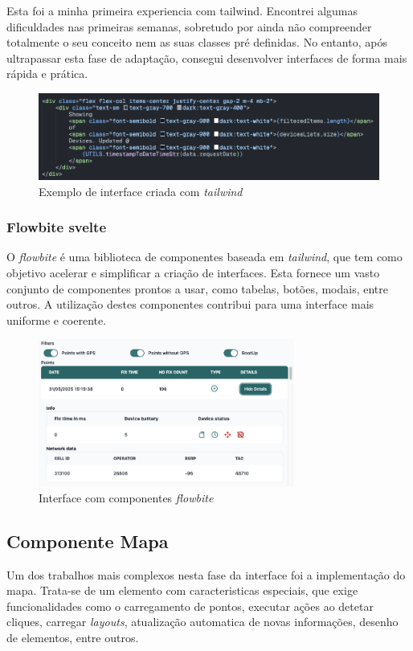 Esta foi a minha primeira experiencia com tailwind. Encontrei algumas dificuldades nas primeiras semanas, sobretudo por ainda não compreender totalmente o seu conceito nem as suas classes pré definidas. No entanto, após ultrapassar esta fase de adaptação, consegui desenvolver interfaces de forma mais rápida e prática.

\begin{figure}[h!]
    \centering
    \includegraphics[width=\textwidth]{figs/tailwind.png}
    \caption{Exemplo de interface criada com \textit{tailwind}}
    \label{fig:tailwind}
\end{figure}

\subsubsection{\textbf{Flowbite svelte}}
O \textit{flowbite} é uma biblioteca de componentes baseada em \textit{tailwind}, que tem como objetivo acelerar e simplificar a criação de interfaces. Esta fornece um vasto conjunto de componentes prontos a usar, como tabelas, botões, modais, entre outros. A utilização destes componentes contribui para uma interface mais uniforme e coerente.

\begin{figure}[h!]
    \centering
    \includegraphics[width=0.75\textwidth]{figs/flowbite.png}
    \caption{Interface com componentes \textit{flowbite}}
    \label{fig:flowbite}
\end{figure}

\subsection{Componente Mapa}\label{sec:map_comp} %
Um dos trabalhos mais complexos nesta fase da interface foi a implementação do mapa. Trata-se de um elemento com caracteristicas especiais, que exige funcionalidades como o carregamento de pontos, executar ações ao detetar cliques, carregar \textit{layouts}, atualização automatica de novas informações, desenho de elementos, entre outros. 


